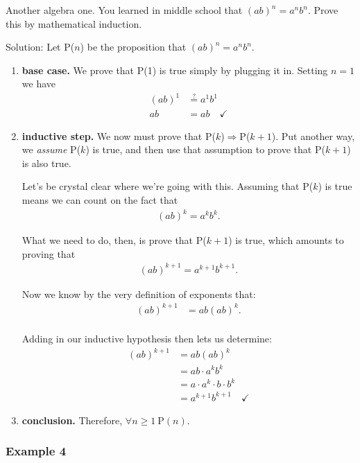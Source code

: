 Another algebra one. You learned in middle school that $(ab)^n=a^n b^n$.
Prove this by mathematical induction.

Solution: Let P($n$) be the proposition that $(ab)^n=a^n b^n$. 

\begin{enumerate}
\item \textbf{base case.} We prove that P(1) is true simply by plugging it
in. Setting $n=1$ we have
\begin{align*}
(ab)^1 & \stackrel{?}{=} a^1 b^1 \\
ab &= ab \quad \checkmark
\end{align*}

\item \textbf{inductive step.}
We now must prove that P($k$)$\Rightarrow$P($k+1$). Put another way, we
\textit{assume} P($k$) is true, and then use that assumption to prove that
P($k+1$) is also true.

Let's be crystal clear where we're going with this. Assuming that P($k$) is
true means we can count on the fact that
\begin{align*}
(ab)^k = a^k b^k.
\end{align*}

What we need to do, then, is prove that P($k+1$) is true, which amounts to
proving that
\begin{align*}
(ab)^{k+1} = a^{k+1} b^{k+1}.
\end{align*}

Now we know by the very definition of exponents that:
\begin{align*}
(ab)^{k+1} &= ab(ab)^k. \\
\end{align*}

Adding in our inductive hypothesis then lets us determine:
\begin{align*}
(ab)^{k+1} &= ab(ab)^k \\
&= ab \cdot a^k b^k \\
&= a \cdot a^k \cdot b \cdot b^k \\
&= a^{k+1} b^{k+1} \quad \checkmark
\end{align*}
\item \textbf{conclusion.} Therefore, $\forall n\geq1 \ \text{P}(n)$.
\end{enumerate}


\subsubsection{Example 4}

